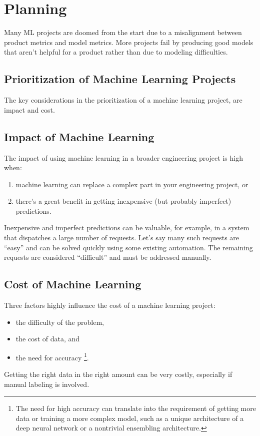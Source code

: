 \section{Planning}
Many ML projects are doomed from the start due to a misalignment between product
metrics and model metrics. More projects fail by producing good models that
aren't helpful for a product rather than due to modeling difficulties.


\subsection{Prioritization of Machine Learning Projects}
The key considerations in the prioritization of a machine learning project,
are impact and cost.


\subsection*{Impact of Machine Learning}
The impact of using machine learning in a broader engineering project is high
when:
\begin{enumerate}
    \item machine learning can replace a complex part in your engineering
    project, or
    \item there's a great benefit in getting inexpensive (but probably
    imperfect) predictions.
\end{enumerate}

Inexpensive and imperfect predictions can be valuable, for example, in a
system that dispatches a large number of requests. Let's say many such
requests are “easy” and can be solved quickly using some existing automation.
The remaining requests are considered “difficult” and must be addressed manually.



\subsection*{Cost of Machine Learning}
Three factors highly influence the cost of a machine learning project:
\begin{itemize}
    \item the difficulty of the problem,
    \item the cost of data, and
    \item the need for accuracy
    \footnote{
        The need for high accuracy can translate into the requirement of
        getting more data or training a more complex model, such as a unique
        architecture of a deep neural network or a nontrivial ensembling
        architecture.
    }.
\end{itemize}
Getting the right data in the right amount can be very costly, especially if
manual labeling is involved.

